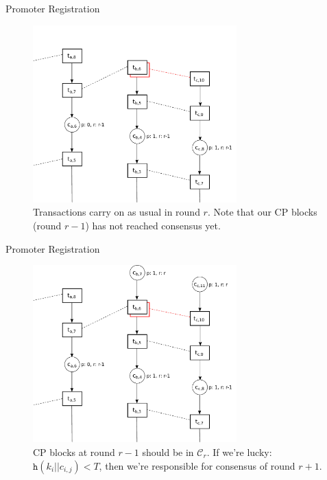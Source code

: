 \documentclass{beamer}
\begin{document}
\begin{frame}{Promoter Registration}

  \begin{figure}[h]
  \includegraphics[width=0.7\textwidth]{trustchain-3}
  \centering
  \caption{Transactions carry on as usual in round $r$. Note that our CP blocks
    (round $r - 1$) has not reached consensus yet.}
  \end{figure}

\end{frame}

\begin{frame}{Promoter Registration}

  \begin{figure}[h]
  \includegraphics[width=0.7\textwidth]{trustchain-4}
  \centering
  \caption{CP blocks at round $r-1$ should be in $\mathcal{C}_r$. If we're
    lucky: $\texttt{h}(k_i || c_{i,j}) < T$, then we're responsible for
    consensus of round $r + 1$.}
  \end{figure}

\end{frame}
\end{document}

